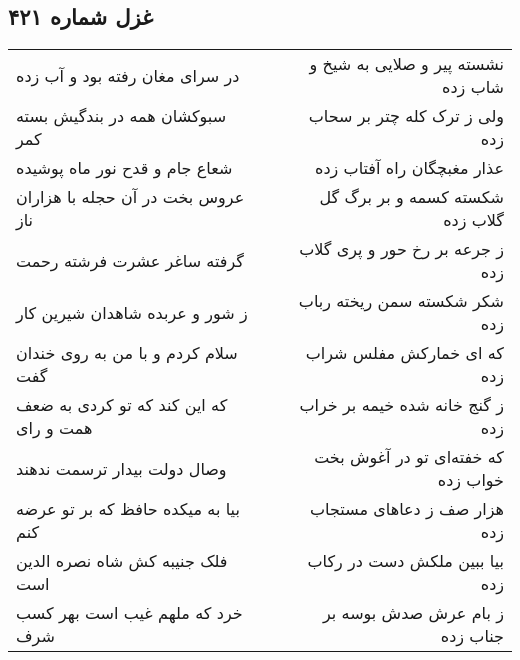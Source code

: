\begin{center}
\section*{غزل شماره ۴۲۱}
\label{sec:sh421}
\begin{longtable}{l p{0.5cm} r}
در سرای مغان رفته بود و آب زده
&&
نشسته پیر و صلایی به شیخ و شاب زده
\\
سبوکشان همه در بندگیش بسته کمر
&&
ولی ز ترک کله چتر بر سحاب زده
\\
شعاع جام و قدح نور ماه پوشیده
&&
عذار مغبچگان راه آفتاب زده
\\
عروس بخت در آن حجله با هزاران ناز
&&
شکسته کسمه و بر برگ گل گلاب زده
\\
گرفته ساغر عشرت فرشته رحمت
&&
ز جرعه بر رخ حور و پری گلاب زده
\\
ز شور و عربده شاهدان شیرین کار
&&
شکر شکسته سمن ریخته رباب زده
\\
سلام کردم و با من به روی خندان گفت
&&
که ای خمارکش مفلس شراب زده
\\
که این کند که تو کردی به ضعف همت و رای
&&
ز گنج خانه شده خیمه بر خراب زده
\\
وصال دولت بیدار ترسمت ندهند
&&
که خفته‌ای تو در آغوش بخت خواب زده
\\
بیا به میکده حافظ که بر تو عرضه کنم
&&
هزار صف ز دعاهای مستجاب زده
\\
فلک جنیبه کش شاه نصره الدین است
&&
بیا ببین ملکش دست در رکاب زده
\\
خرد که ملهم غیب است بهر کسب شرف
&&
ز بام عرش صدش بوسه بر جناب زده
\\
\end{longtable}
\end{center}
